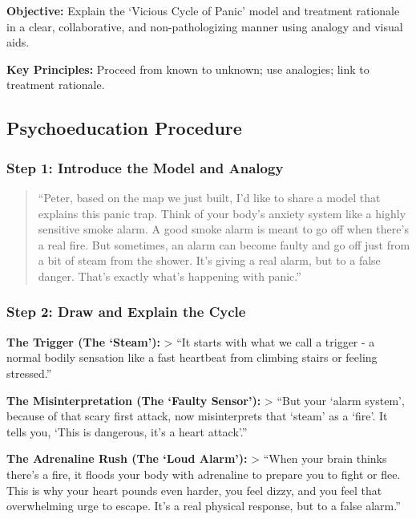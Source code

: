 \documentclass[
  american,
  letterpaper,
  DIV=11,
  numbers=noendperiod]{scrartcl}
\begin{document}
\textbf{Objective:} Explain the `Vicious Cycle of Panic' model and
treatment rationale in a clear, collaborative, and non-pathologizing
manner using analogy and visual aids.

\textbf{Key Principles:} Proceed from known to unknown; use analogies;
link to treatment rationale.

\subsection{Psychoeducation Procedure}\label{psychoeducation-procedure}

\subsubsection{Step 1: Introduce the Model and
Analogy}\label{step-1-introduce-the-model-and-analogy}

\begin{quote}
``Peter, based on the map we just built, I'd like to share a model that
explains this panic trap. Think of your body's anxiety system like a
highly sensitive smoke alarm. A good smoke alarm is meant to go off when
there's a real fire. But sometimes, an alarm can become faulty and go
off just from a bit of steam from the shower. It's giving a real alarm,
but to a false danger. That's exactly what's happening with panic.''
\end{quote}

\subsubsection{Step 2: Draw and Explain the
Cycle}\label{step-2-draw-and-explain-the-cycle}

\textbf{The Trigger (The `Steam'):} \textgreater{} ``It starts with what
we call a trigger - a normal bodily sensation like a fast heartbeat from
climbing stairs or feeling stressed.''

\textbf{The Misinterpretation (The `Faulty Sensor'):} \textgreater{}
``But your `alarm system', because of that scary first attack, now
misinterprets that `steam' as a `fire'. It tells you, `This is
dangerous, it's a heart attack'.''

\textbf{The Adrenaline Rush (The `Loud Alarm'):} \textgreater{} ``When
your brain thinks there's a fire, it floods your body with adrenaline to
prepare you to fight or flee. This is why your heart pounds even harder,
you feel dizzy, and you feel that overwhelming urge to escape. It's a
real physical response, but to a false alarm.''
\end{document}
